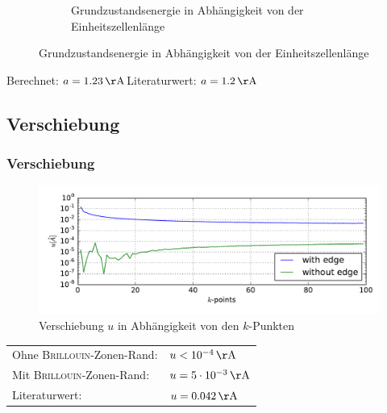 \begin{frame}
\begin{figure}[]
\begin{subfigure}{0.45\textwidth}
		\caption{Grundzustandsenergie in Abhängigkeit von der Einheitszellenlänge}
		\label{image_poly_cell_len}
	\end{subfigure}
\end{figure}
\vspace*{-.5cm}

Berechnet: $a = \unit[1.23]{\AA}$\hfill Literaturwert: $a = \unit[1.2]{\AA}$
\end{frame}

\subsection{Verschiebung}
\begin{frame}
\frametitle{Verschiebung}
\begin{figure}
	\centering
	\includegraphics[width = \textwidth]{Images/polyacetylene/convergence/polyacetylene_displacement}
	\caption{Verschiebung $u$ in Abhängigkeit von den $k$-Punkten}
	\label{image_k_point_sampling_assymetry}
\end{figure}
\centering
\begin{tabular}{ll}
Ohne \textsc{Brillouin}-Zonen-Rand:& $u < \unit[10^{-4}]{\AA}$\\
Mit \textsc{Brillouin}-Zonen-Rand:&$u = \unit[5\cdot10^{-3}]{\AA}$\\
Literaturwert:& $u = \unit[0.042]{\AA}$
\end{tabular}
\end{frame}


